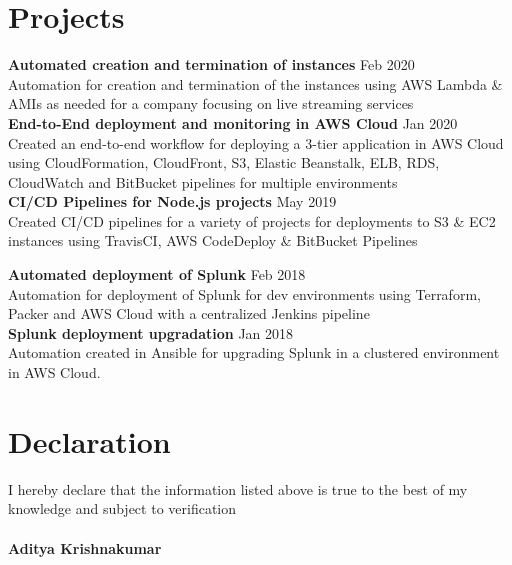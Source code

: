 \documentclass[margin,line]{res}
\begin{document}
\begin{resume}
\section{\sc Projects}

{\bf Automated creation and termination of instances} \hfill{Feb 2020}\\
Automation for creation and termination of the instances using AWS Lambda \& AMIs as needed for a company focusing on live streaming services\\

{\bf End-to-End deployment and monitoring in AWS Cloud} \hfill{Jan 2020}\\
Created an end-to-end workflow for deploying a 3-tier application in AWS Cloud using CloudFormation, CloudFront, S3, Elastic Beanstalk, ELB, RDS, CloudWatch and BitBucket pipelines for multiple environments\\

{\bf CI/CD Pipelines for Node.js projects} \hfill{May 2019}\\
Created CI/CD pipelines for a variety of projects for deployments to S3 \& EC2 instances using TravisCI, AWS CodeDeploy \& BitBucket Pipelines

{\bf Automated deployment of Splunk} \hfill{Feb 2018}\\
Automation for deployment of Splunk for dev environments using Terraform, Packer and AWS Cloud with a centralized Jenkins pipeline\\

{\bf Splunk deployment upgradation} \hfill{Jan 2018}\\
Automation created in Ansible for upgrading Splunk in a clustered environment in AWS Cloud.\\


\section{\sc Declaration }
I hereby declare that the information listed above is true to the best of my knowledge and subject to verification \\
\\{\bf Aditya Krishnakumar} 

\end{resume}
\end{document}

